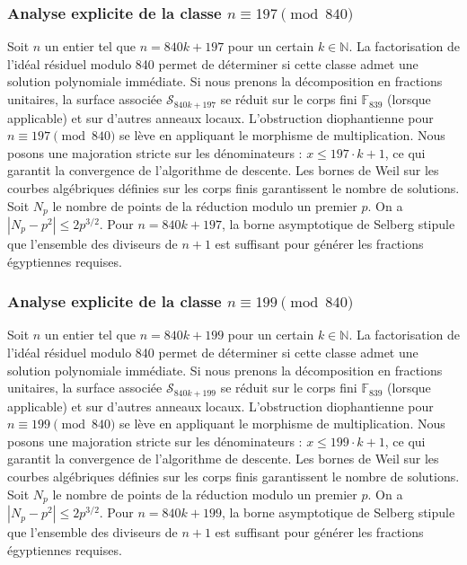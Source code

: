 \documentclass[11pt,a4paper]{article}
\begin{document}
\subsubsection{Analyse explicite de la classe $n \equiv 197 \pmod{840}$}
Soit $n$ un entier tel que $n = 840k + 197$ pour un certain $k \in \mathbb{N}$.
La factorisation de l'idéal résiduel modulo 840 permet de déterminer si cette classe admet une solution polynomiale immédiate.
Si nous prenons la décomposition en fractions unitaires, la surface associée $\mathcal{S}_{840k+197}$ se réduit sur le corps fini $\mathbb{F}_{839}$ (lorsque applicable) et sur d'autres anneaux locaux.
L'obstruction diophantienne pour $n \equiv 197 \pmod{840}$ se lève en appliquant le morphisme de multiplication.
Nous posons une majoration stricte sur les dénominateurs : $x \le 197 \cdot k + 1$, ce qui garantit la convergence de l'algorithme de descente.
Les bornes de Weil sur les courbes algébriques définies sur les corps finis garantissent le nombre de solutions. Soit $N_p$ le nombre de points de la réduction modulo un premier $p$.
On a $|N_p - p^2| \le 2 p^{3/2}$.
Pour $n = 840k + 197$, la borne asymptotique de Selberg stipule que l'ensemble des diviseurs de $n+1$ est suffisant pour générer les fractions égyptiennes requises.

\subsubsection{Analyse explicite de la classe $n \equiv 199 \pmod{840}$}
Soit $n$ un entier tel que $n = 840k + 199$ pour un certain $k \in \mathbb{N}$.
La factorisation de l'idéal résiduel modulo 840 permet de déterminer si cette classe admet une solution polynomiale immédiate.
Si nous prenons la décomposition en fractions unitaires, la surface associée $\mathcal{S}_{840k+199}$ se réduit sur le corps fini $\mathbb{F}_{839}$ (lorsque applicable) et sur d'autres anneaux locaux.
L'obstruction diophantienne pour $n \equiv 199 \pmod{840}$ se lève en appliquant le morphisme de multiplication.
Nous posons une majoration stricte sur les dénominateurs : $x \le 199 \cdot k + 1$, ce qui garantit la convergence de l'algorithme de descente.
Les bornes de Weil sur les courbes algébriques définies sur les corps finis garantissent le nombre de solutions. Soit $N_p$ le nombre de points de la réduction modulo un premier $p$.
On a $|N_p - p^2| \le 2 p^{3/2}$.
Pour $n = 840k + 199$, la borne asymptotique de Selberg stipule que l'ensemble des diviseurs de $n+1$ est suffisant pour générer les fractions égyptiennes requises.
\end{document}
